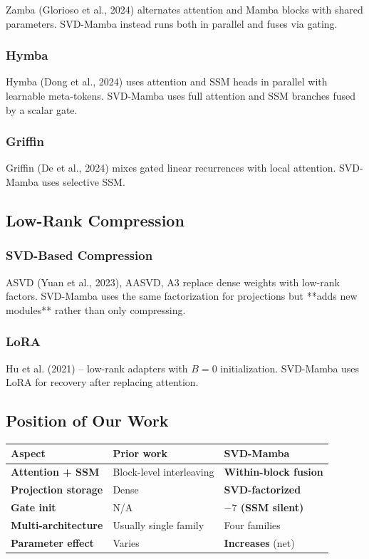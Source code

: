 Zamba (Glorioso et al., 2024) alternates attention and Mamba blocks with 
shared parameters. SVD-Mamba instead runs both in parallel and fuses via 
gating.

\subsubsection{Hymba}

Hymba (Dong et al., 2024) uses attention and SSM heads in parallel with 
learnable meta-tokens. SVD-Mamba uses full attention and SSM branches 
fused by a scalar gate.

\subsubsection{Griffin}

Griffin (De et al., 2024) mixes gated linear recurrences with local 
attention. SVD-Mamba uses selective SSM.

\subsection{Low-Rank Compression}

\subsubsection{SVD-Based Compression}

ASVD (Yuan et al., 2023), AASVD, A3 replace dense weights with low-rank 
factors. SVD-Mamba uses the same factorization for projections but **adds 
new modules** rather than only compressing.

\subsubsection{LoRA}

Hu et al. (2021) -- low-rank adapters with $B=0$ initialization. SVD-Mamba 
uses LoRA for recovery after replacing attention.

\subsection{Position of Our Work}

\begin{table}[H]
\centering
\small
\begin{tabular}{lll}
\toprule
\textbf{Aspect} & \textbf{Prior work} & \textbf{SVD-Mamba} \\
\midrule
\textbf{Attention + SSM} & Block-level interleaving & \textbf{Within-block fusion} \\
\textbf{Projection storage} & Dense & \textbf{SVD-factorized} \\
\textbf{Gate init} & N/A & \textbf{$-7$ (SSM silent)} \\
\textbf{Multi-architecture} & Usually single family & Four families \\
\textbf{Parameter effect} & Varies & \textbf{Increases} (net) \\
\bottomrule
\end{tabular}
\end{table}

